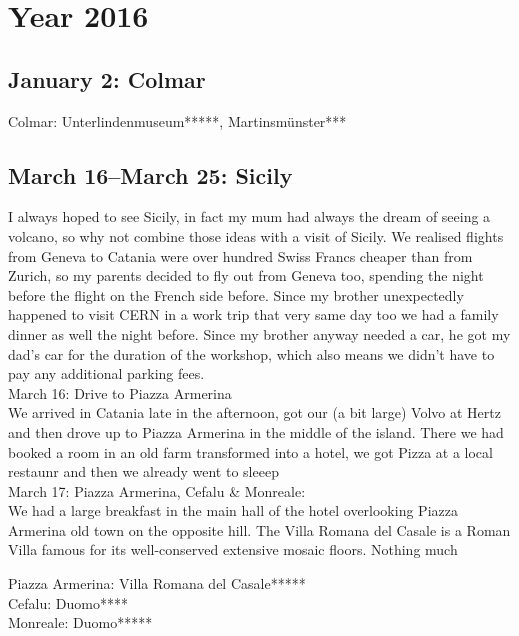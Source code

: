 \chapter{Year 2016}
\label{2016}

\section{January 2: Colmar}
\label{Colmar2016}

Colmar: Unterlindenmuseum*****, Martinsm\"unster***

\section{March 16--March 25: Sicily}
\label{Sicily2016}

I always hoped to see Sicily, in fact my mum had always the dream of seeing a volcano, so why not combine those ideas with a visit of Sicily. We realised flights from Geneva to Catania were over hundred Swiss Francs cheaper than from Zurich, so my parents decided to fly out from Geneva too, spending the night before the flight on the French side before. Since my brother unexpectedly happened to visit CERN in a work trip that very same day too we had a family dinner as well the night before. Since my brother anyway needed a car, he got my dad's car for the duration of the workshop, which also means we didn't have to pay any additional parking fees.\\

March 16: Drive to Piazza Armerina\\
We arrived in Catania late in the afternoon, got our (a bit large) Volvo at Hertz and then drove up to Piazza Armerina in the middle of the island. There we had booked a room in an old farm transformed into a hotel, we got Pizza at a local restaunr and then we already went to sleeep\\

March 17: Piazza Armerina, Cefalu \& Monreale:\\
We had a large breakfast in the main hall of the hotel overlooking Piazza Armerina old town on the opposite hill. The Villa Romana del Casale is a Roman Villa famous for its well-conserved extensive mosaic floors. Nothing much 

Piazza Armerina: Villa Romana del Casale*****\\
Cefalu: Duomo****\\
Monreale: Duomo*****\\

